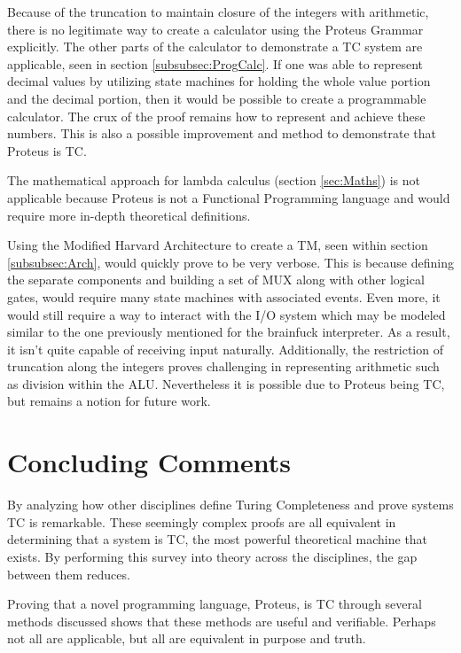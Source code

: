 Because of the truncation to maintain closure of the integers with arithmetic, there is no legitimate way to create a calculator using the Proteus Grammar explicitly.
The other parts of the calculator to demonstrate a TC system are applicable, seen in section \ref{subsubsec:ProgCalc}.
If one was able to represent decimal values by utilizing state machines for holding the whole value portion and the decimal portion, then it would be possible to create a programmable calculator.
The crux of the proof remains how to represent and achieve these numbers.
This is also a possible improvement and method to demonstrate that Proteus is TC.

The mathematical approach for lambda calculus (section \ref{sec:Maths}) is not applicable because Proteus is not a Functional Programming language and would require more in-depth theoretical definitions.

Using the Modified Harvard Architecture to create a TM, seen within section \ref{subsubsec:Arch}, would quickly prove to be very verbose.
This is because defining the separate components and building a set of MUX along with other logical gates, would require many state machines with associated events.
Even more, it would still require a way to interact with the I/O system which may be modeled similar to the one previously mentioned for the brainfuck interpreter.
As a result, it isn't quite capable of receiving input naturally.
Additionally, the restriction of truncation along the integers proves challenging in representing arithmetic such as division within the ALU.
Nevertheless it is possible due to Proteus being TC, but remains a notion for future work.

\section{Concluding Comments}\label{sec:ConclComm}

By analyzing how other disciplines define Turing Completeness and prove systems TC is remarkable.
These seemingly complex proofs are all equivalent in determining that a system is TC, the most powerful theoretical machine that exists.
By performing this survey into theory across the disciplines, the gap between them reduces.

Proving that a novel programming language, Proteus, is TC through several methods discussed shows that these methods are useful and verifiable.
Perhaps not all are applicable, but all are equivalent in purpose and truth.

